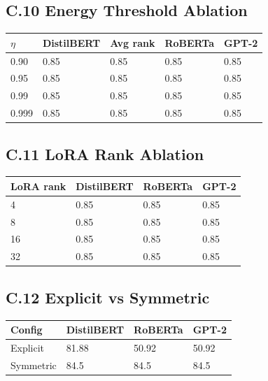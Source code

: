 \subsection{C.10 Energy Threshold Ablation}

\begin{table}[H]
\centering
\small
\begin{tabular}{lllll}
\toprule
\textbf{$\eta$} & \textbf{DistilBERT} & \textbf{Avg rank} & \textbf{RoBERTa} & \textbf{GPT-2} \\
\midrule
0.90 & 0.85 & 0.85 & 0.85 & 0.85 \\
0.95 & 0.85 & 0.85 & 0.85 & 0.85 \\
0.99 & 0.85 & 0.85 & 0.85 & 0.85 \\
0.999 & 0.85 & 0.85 & 0.85 & 0.85 \\
\bottomrule
\end{tabular}
\end{table}

\subsection{C.11 LoRA Rank Ablation}

\begin{table}[H]
\centering
\small
\begin{tabular}{llll}
\toprule
\textbf{LoRA rank} & \textbf{DistilBERT} & \textbf{RoBERTa} & \textbf{GPT-2} \\
\midrule
4 & 0.85 & 0.85 & 0.85 \\
8 & 0.85 & 0.85 & 0.85 \\
16 & 0.85 & 0.85 & 0.85 \\
32 & 0.85 & 0.85 & 0.85 \\
\bottomrule
\end{tabular}
\end{table}

\subsection{C.12 Explicit vs Symmetric}

\begin{table}[H]
\centering
\small
\begin{tabular}{llll}
\toprule
\textbf{Config} & \textbf{DistilBERT} & \textbf{RoBERTa} & \textbf{GPT-2} \\
\midrule
Explicit & 81.88 & 50.92 & 50.92 \\
Symmetric & 84.5 & 84.5 & 84.5 \\
\bottomrule
\end{tabular}
\end{table}

